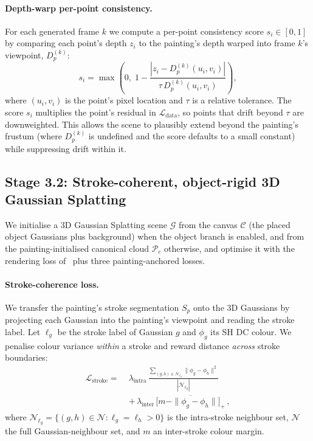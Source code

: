 \documentclass[10pt,twocolumn,letterpaper]{article}
\begin{document}
\paragraph{Depth-warp per-point consistency.}
For each generated frame $k$ we compute a per-point consistency score $s_i
\in [0,1]$ by comparing each point's depth $z_i$ to the painting's depth
warped into frame $k$'s viewpoint, $D_p^{(k)}$:
\begin{equation}
s_i = \max\!\left(0,\; 1 - \frac{|z_i - D_p^{(k)}(u_i,v_i)|}
{\tau\, D_p^{(k)}(u_i,v_i)}\right),
\end{equation}
where $(u_i,v_i)$ is the point's pixel location and $\tau$ is a relative
tolerance. The score $s_i$ multiplies the point's residual in
$\mathcal{L}_\text{data}$, so points that drift beyond $\tau$ are
downweighted. This allows the scene to plausibly extend beyond the painting's
frustum (where $D_p^{(k)}$ is undefined and the score defaults to a small
constant) while suppressing drift within it.

\subsection{Stage 3.2: Stroke-coherent, object-rigid 3D Gaussian Splatting}
\label{sec:stage3}

We initialise a 3D Gaussian Splatting scene $\mathcal{G}$
from the canvas $\mathcal{C}$ (the placed object Gaussians plus background)
when the object branch is enabled, and from the painting-initialised
canonical cloud $\mathcal{P}_c$ otherwise, and optimise it with the rendering
loss of~\cite{hoellein2026worldreconstruction} plus three painting-anchored
losses.

\paragraph{Stroke-coherence loss.}
We transfer the painting's stroke segmentation $S_p$ onto the 3D Gaussians by
projecting each Gaussian into the painting's viewpoint and reading the stroke
label. Let $\ell_g$ be the stroke label of Gaussian $g$ and $\phi_g$ its SH
DC colour. We penalise colour variance \emph{within} a stroke and reward
distance \emph{across} stroke boundaries:
\begin{align}
\mathcal{L}_\text{stroke} =\; & \lambda_\text{intra}\,
\frac{\sum_{(g,h)\in \mathcal{N}_{\ell_g}} \|\phi_g\!-\!\phi_h\|^2}
{|\mathcal{N}_{\ell_g}|} \nonumber\\
& +\, \lambda_\text{inter}\,
\overline{\big[m - \|\phi_g\!-\!\phi_h\|\big]_+}\,,
\end{align}
where $\mathcal{N}_{\ell_g}=\{(g,h)\!\in\!\mathcal{N}\!:\!\ell_g\!=\!\ell_h\!>\!0\}$
is the intra-stroke neighbour set, $\mathcal{N}$ the full Gaussian-neighbour
set, and $m$ an inter-stroke colour margin.
\end{document}
